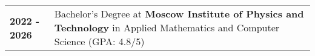 \begin{tabularx}{\linewidth}{@{}l X@{}}	
  
  \textbf{2022 - 2026} & Bachelor's Degree at \textbf{Moscow Institute of Physics and Technology} in Applied Mathematics and Computer Science   \normalsize (GPA: 4.8/5) \\ 
  
\end{tabularx}